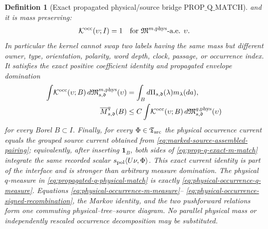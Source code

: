 \documentclass[11pt]{article}
\newtheorem{definition}[theorem]{Definition}
\newcommand{\one}{\mathbf 1}
\begin{document}
\begin{definition}[Exact propagated physical/source bridge
$\mathrm{PROP\_Q\_MATCH}$]
and it is mass preserving:
\begin{equation}
\label{eq:prop-q-occurrence-kernel-markov}
 \mathcal K^{\rm occ}(\upsilon;I)=1
 \quad\text{for }\mathfrak M^{m,\rm phys}\text{-a.e. }\upsilon.
\end{equation}
In particular the kernel cannot swap two labels having the same mass but
different owner, type, orientation, polarity, word depth, clock, passage,
or occurrence index.  It satisfies the exact positive coefficient identity
and propagated envelope domination
\begin{align}
 \int \!\mathcal K^{\rm occ}(\upsilon;B)
       \,d\mathfrak M_{s,\mathfrak d}^{m,\rm phys}(\upsilon)
 &=\int_Bd\Pi_{s,\mathfrak d}(\lambda)m_\lambda(da),
 \label{eq:prop-q-exact-m-match}\\
 \overline M_{s,\mathfrak d}^{q}(B)
 &\le C\int\!\mathcal K^{\rm occ}(\upsilon;B)
       \,d\mathfrak M_{s,\mathfrak d}^{q,\rm phys}(\upsilon)
 \label{eq:propagated-q-physical-match}
\end{align}
for every Borel $B\subset I$.  Finally, for every
$\Phi\in\mathfrak T_{\rm src}$ the physical occurrence current equals the
grouped source current obtained from
\eqref{eq:marked-source-assembled-pairing}; equivalently, after inserting
$\one_B$, both sides of \eqref{eq:prop-q-exact-m-match} integrate the same
recorded scalar
$s_{\rm pol}\langle U\nu,\Phi\rangle$.  This exact current identity is part
of the interface and is stronger than arbitrary measure domination.
The physical $q$-measure in \eqref{eq:propagated-q-physical-match} is exactly
\eqref{eq:physical-occurrence-q-measure}.  Equations
\eqref{eq:physical-occurrence-m-measure}--
\eqref{eq:physical-occurrence-signed-recombination}, the Markov identity,
and the two pushforward relations form one commuting physical--tree--source
diagram.  No parallel physical mass or independently rescaled occurrence
decomposition may be substituted.
\end{definition}
\end{document}
